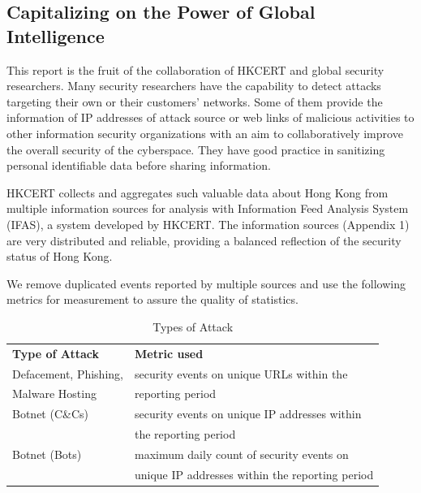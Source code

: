 \documentclass[11pt]{article}
\begin{document}
\subsection*{Capitalizing on the Power of Global Intelligence}

This report is the fruit of the collaboration of HKCERT and global security researchers. Many security researchers have the capability to detect attacks targeting their own or their customers’ networks. Some of them provide the information of IP addresses of attack source or web links of malicious activities to other information security organizations with an aim to collaboratively improve the overall security of the cyberspace. They have good practice in sanitizing personal identifiable data before sharing information.

HKCERT collects and aggregates such valuable data about Hong Kong from multiple information sources for analysis with Information Feed Analysis System (IFAS), a system developed by HKCERT. The information sources (Appendix 1) are very distributed and reliable, providing a balanced reflection of the security status of Hong Kong.

We remove duplicated events reported by multiple sources and use the following metrics for measurement to assure the quality of statistics.

\begin{table}[b]
\centering
\caption{Types of Attack}
\begin{tabular}{ll}
\hline
\textbf{ Type of Attack}              & \textbf{ Metric used}                                                                         \\\hhline{==}
Defacement, Phishing,                 & security events on unique URLs within the             \\
Malware Hosting                       & reporting period\\\hline
Botnet (C\&Cs)                        & security events on unique IP addresses within    \\
                                      & the reporting period \\\hline
Botnet (Bots)                         & maximum daily count of security events on  \\
                                      & unique IP addresses within the reporting period \\\hline
\end{tabular}

\end{table}
\end{document}
